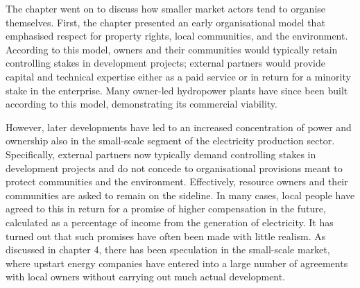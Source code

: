 The chapter went on to discuss how smaller market actors tend to organise themselves. First, the chapter presented an early organisational model that emphasised respect for property rights, local communities, and the environment. According to this model, owners and their communities would typically retain controlling stakes in development projects; external partners would provide capital and technical expertise either as a paid service or in return for a minority stake in the enterprise. Many owner-led hydropower plants have since been built according to this model, demonstrating its commercial viability.

However, later developments have led to an increased concentration of power and ownership also in the small-scale segment of the electricity production sector. Specifically, external partners now typically demand controlling stakes in development projects and do not concede to organisational provisions meant to protect communities and the environment. Effectively, resource owners and their communities are asked to remain on the sideline. In many cases, local people have agreed to this in return for a promise of higher compensation in the future, calculated as a percentage of income from the generation of electricity. It has turned out that such promises have often been made with little realism. As discussed in chapter 4, there has been speculation in the small-scale market, where upstart energy companies have entered into a large number of agreements with local owners without carrying out much actual development. %

